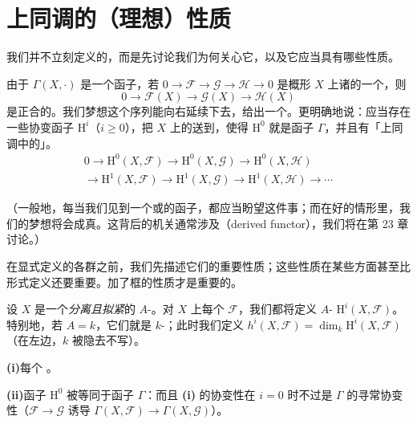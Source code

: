 
\section{上同调的（理想）性质}

我们并不立刻定义\trQCSheaf{}的\trCohomology，而是先讨论我们为何关心它，以及它应当具有哪些性质。

由于 $\Gamma(X,\cdot)$ 是一个\trLeftExact{}函子，若
$0\to\mathscr{F}\to\mathscr{G}\to\mathscr{H}\to 0$ 是概形 $X$ 上诸\trQCSheaf{}的一个\trShortExactSequence，则
\[
0\longrightarrow \mathscr{F}(X)\longrightarrow \mathscr{G}(X)\longrightarrow \mathscr{H}(X)
\]
是正合的。我们梦想这个序列能向右延续下去，给出一个\trLongExactSequence。更明确地说：应当存在一些协变函子
$\mathrm{H}^i$（$i\ge 0$），把 $X$ 上的\trQCSheaf{}送到\trGroup，使得 $\mathrm{H}^0$ 就是\trGlobalSections{}函子
$\Gamma$，并且有「上同调中的\trLongExactSequence」。
\begin{equation*}\tag{18.1.0.1}\label{eq:cohomology-long-exact-seq}
\begin{gathered}
0\longrightarrow \mathrm{H}^0(X,\mathscr{F})\longrightarrow \mathrm{H}^0(X,\mathscr{G})\longrightarrow \mathrm{H}^0(X,\mathscr{H})\\[10pt]
\longrightarrow \mathrm{H}^1(X,\mathscr{F})\longrightarrow \mathrm{H}^1(X,\mathscr{G})\longrightarrow \mathrm{H}^1(X,\mathscr{H})\longrightarrow\cdots
\end{gathered}
\end{equation*}

（一般地，每当我们见到一个\trLeftExact{}或\trRightExact{}的函子，都应当盼望这件事；而在好的情形里，我们的梦想将会成真。这背后的机关通常涉及\emph{\trDerivedFunctor}（derived functor），我们将在第 23 章讨论。）

在显式定义\trQCSheaf{}的各\trCohomology{}群之前，我们先描述它们的重要性质；这些性质在某些方面甚至比形式定义还要重要。加了框的性质才是重要的。

设 $X$ 是一个\emph{分离且拟紧}的 $A$-\trScheme。对 $X$ 上每个\trQCSheaf{} $\mathscr{F}$，我们都将定义 $A$-\trModule{}
$\mathrm{H}^i(X,\mathscr{F})$。特别地，若 $A=k$，它们就是 $k$-\trVectorSpace；此时我们定义
$h^i(X,\mathscr{F})=\dim_k\mathrm{H}^i(X,\mathscr{F})$（在左边，$k$ 被隐去不写）。

\textbf{(i)}\quad 每个 。

\textbf{(ii)}\quad 函子 $\mathrm{H}^0$ 被等同于函子 $\Gamma$：而且 \textbf{(i)} 的协变性在 $i=0$ 时不过是 $\Gamma$ 的寻常协变性（$\mathscr{F}\to\mathscr{G}$ 诱导
$\Gamma(X,\mathscr{F})\to\Gamma(X,\mathscr{G})$）。

